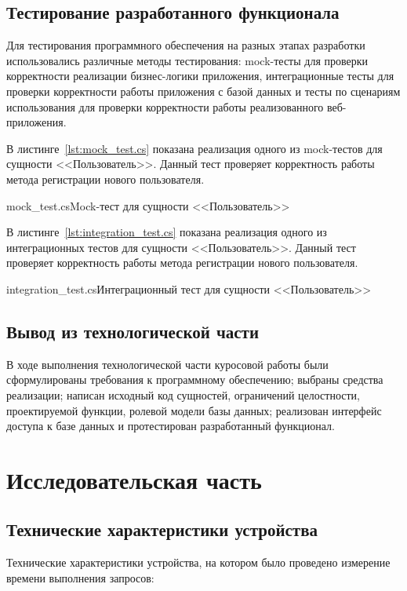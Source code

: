 \documentclass{bmstu}
\begin{document}
\section{Тестирование разработанного функционала}

Для тестирования программного обеспечения на разных этапах разработки использовались различные методы тестирования: mock-тесты для проверки корректности реализации бизнес-логики приложения, интеграционные тесты для проверки корректности работы приложения с базой данных и тесты по сценариям использования для проверки корректности работы реализованного веб-приложения. 

В листинге~\ref{lst:mock_test.cs} показана реализация одного из mock-тестов для сущности <<Пользователь>>. 
Данный тест проверяет корректность работы метода регистрации нового пользователя.

{mock_test.cs}{Mock-тест для сущности <<Пользователь>>}

В листинге~\ref{lst:integration_test.cs} показана реализация одного из интеграционных тестов для сущности <<Пользователь>>. 
Данный тест проверяет корректность работы метода регистрации нового пользователя.

{integration_test.cs}{Интеграционный тест для сущности <<Пользователь>>}

\section*{Вывод из технологической части}

В ходе выполнения технологической части куросовой работы были сформулированы требования к программному обеспечению; выбраны средства реализации; написан исходный код сущностей, ограничений целостности, проектируемой функции, ролевой модели базы данных; реализован интерфейс доступа к базе данных и протестирован разработанный функционал.

\chapter{Исследовательская часть}

\section{Технические характеристики устройства}

Технические характеристики устройства, на котором было проведено измерение времени выполнения запросов:
\end{document}
